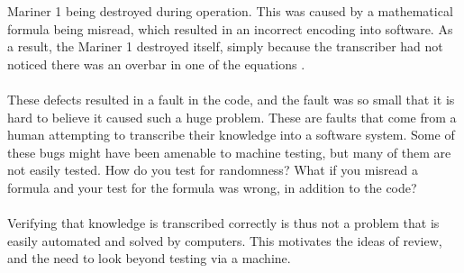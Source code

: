 Mariner 1 being destroyed during operation.
This was caused by a mathematical formula being misread, which resulted in an incorrect
encoding into software.
As a result, the Mariner 1 destroyed itself, simply because the transcriber had not noticed there
was an overbar in one of the equations \cite{MarinerBoom}.\\
\\
These defects resulted in a fault in the code, and the fault was so small that it is hard to believe
it caused such a huge problem.
These are faults that come from a human attempting to transcribe their knowledge into a software
system.
Some of these bugs might have been amenable to machine testing, but many of them are not easily
tested.
How do you test for randomness?
What if you misread a formula and your test for the formula was wrong, in addition to the code?\\
\\
Verifying that knowledge is transcribed correctly is thus not a problem that is easily automated and
solved by computers.
This motivates the ideas of review, and the need to look beyond testing via a machine.
